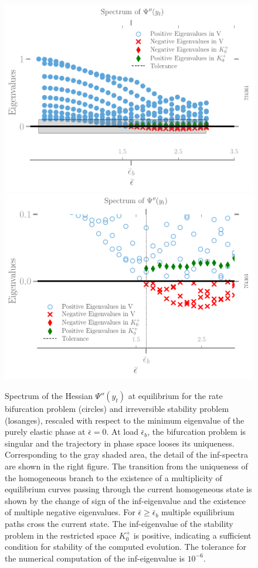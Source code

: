 

\begin{figure}[htbp]
    \centering
    \includegraphics*[width=.7\textwidth]{../images/spectra-7f4361886184f3c6791fe16bf4f4b3f2.pdf}
    \includegraphics*[width=.7\textwidth]{../images/spectra-zoom-7f4361886184f3c6791fe16bf4f4b3f2.pdf}
    \caption{Spectrum of the Hessian $\Psi''(y_t)$ at equilibrium for the rate bifurcation problem (circles) and irreversible stability problem (losanges), rescaled with respect to the minimum eigenvalue of the purely elastic phase at $\bar \epsilon = 0$. At load $\bar \epsilon_b$, the bifurcation problem is singular and the trajectory in phase space looses its uniqueness. 
    Corresponding to the gray shaded area, the detail of the inf-spectra are shown in the right figure. The transition from the uniqueness of the homogeneous branch to the existence of a multiplicity of equilibrium curves passing through the current homogeneous state is shown by the change of sign of the inf-eigenvalue and the existence of multiple negative eigenvalues. For $\bar \epsilon \geq \bar \epsilon_b$ multiple equilibrium paths cross the current state. The inf-eigenvalue of the stability problem in the restricted space $K^+_0$ is positive, indicating a sufficient condition for stability of the computed evolution. The tolerance for the numerical computation of the inf-eigenvalue is $10^{-6}$.}
    \label{fig:irreversibility}
\end{figure}


